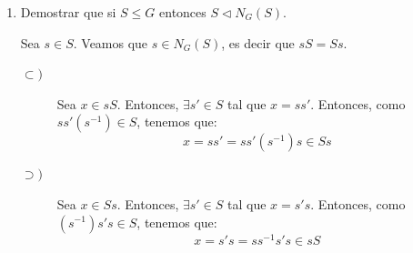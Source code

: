 \begin{ejercicio}
\begin{enumerate}

        Comprobamos ahora que $C_G(S)\lhd N_G(S)$. Para ello, tomamos $x\in N_G(S)$ y $y\in C_G(S)$, y veamos que $xyx^{-1}\in C_G(S)$. Para ello, tomamos $s\in S$, y como $x\in N_G(S)$, tenemos que $xS=Sx$, por lo que $sx = xs'$ con $s'\in S$ y por tanto $x^{-1}sx \in S$. Entonces:
        \begin{equation*}
            yx^{-1}sx = x^{-1}sxy
            \Longrightarrow xyx^{-1}s = sxyx^{-1}
            \Longrightarrow xyx^{-1}\in C_G(S)
        \end{equation*}
        \item Demostrar que si $S\leq G$ entonces $S\lhd N_G(S)$.
        
        Sea $s\in S$. Veamos que $s\in N_G(S)$, es decir que $sS=Ss$.
        \begin{description}
            \item[$\subset)$] Sea $x\in sS$. Entonces, $\exists s'\in S$ tal que $x=ss'$. Entonces, como $ss'(s^{-1})\in S$, tenemos que:
            \begin{equation*}
                x=ss'=ss'(s^{-1})s\in Ss
            \end{equation*}

            \item[$\supset)$] Sea $x\in Ss$. Entonces, $\exists s'\in S$ tal que $x=s's$. Entonces, como $(s^{-1})s's\in S$, tenemos que:
            \begin{equation*}
                x=s's=ss^{-1}s's\in sS
            \end{equation*}
        \end{description}


\end{enumerate}
\end{ejercicio}
